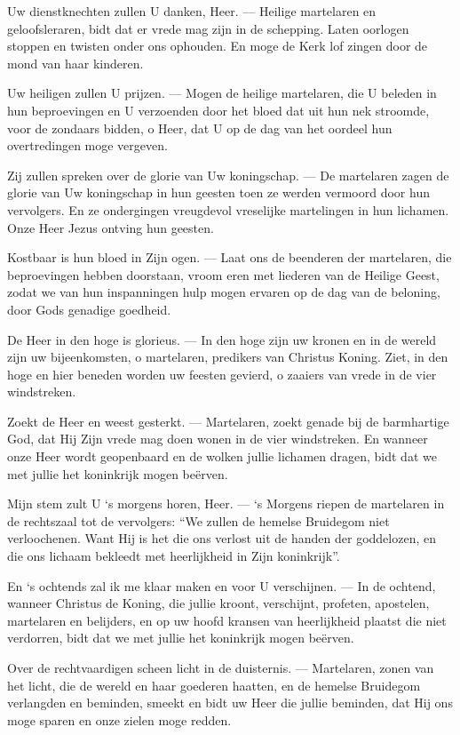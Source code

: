 \documentclass[12pt,twoside,a5paper]{article}
\begin{document}
\begin{halfparskip}
   Uw dienstknechten zullen U danken, Heer. --- Heilige martelaren en geloofsleraren, bidt dat er vrede mag zijn in de schepping. Laten oorlogen stoppen en twisten onder ons ophouden. En moge de Kerk lof zingen door de mond van haar kinderen.

  Uw heiligen zullen U prijzen. --- Mogen de heilige martelaren, die U beleden in hun beproevingen en U verzoenden door het bloed dat uit hun nek stroomde, voor de zondaars bidden, o Heer, dat U op de dag van het oordeel hun overtredingen moge vergeven.

  Zij zullen spreken over de glorie van Uw koningschap. --- De martelaren zagen de glorie van Uw koningschap in hun geesten toen ze werden vermoord door hun vervolgers. En ze ondergingen vreugdevol vreselijke martelingen in hun lichamen. Onze Heer Jezus ontving hun geesten.

  Kostbaar is hun bloed in Zijn ogen. --- Laat ons de beenderen der martelaren, die beproevingen hebben doorstaan, vroom eren met liederen van de Heilige Geest, zodat we van hun inspanningen hulp mogen ervaren op de dag van de beloning, door Gods genadige goedheid.

  De Heer in den hoge is glorieus. --- In den hoge zijn uw kronen en in de wereld zijn uw bijeenkomsten, o martelaren, predikers van Christus Koning. Ziet, in den hoge en hier beneden worden uw feesten gevierd, o zaaiers van vrede in de vier windstreken.

  Zoekt de Heer en weest gesterkt. --- Martelaren, zoekt genade bij de barmhartige God, dat Hij Zijn vrede mag doen wonen in de vier windstreken. En wanneer onze Heer wordt geopenbaard en de wolken jullie lichamen dragen, bidt dat we met jullie het koninkrijk mogen beërven.

  Mijn stem zult U `s morgens horen, Heer. --- `s Morgens riepen de martelaren in de rechtszaal tot de vervolgers: ``We zullen de hemelse Bruidegom niet verloochenen. Want Hij is het die ons verlost uit de handen der goddelozen, en die ons lichaam bekleedt met heerlijkheid in Zijn koninkrijk''.

  En `s ochtends zal ik me klaar maken en voor U verschijnen. --- In de ochtend, wanneer Christus de Koning, die jullie kroont, verschijnt, profeten, apostelen, martelaren en belijders, en op uw hoofd kransen van heerlijkheid plaatst die niet verdorren, bidt dat we met jullie het koninkrijk mogen beërven.

  Over de rechtvaardigen scheen licht in de duisternis. --- Martelaren, zonen van het licht, die de wereld en haar goederen haatten, en de hemelse Bruidegom verlangden en beminden, smeekt en bidt uw Heer die jullie beminden, dat Hij ons moge sparen en onze zielen moge redden.


\end{halfparskip}
\end{document}

